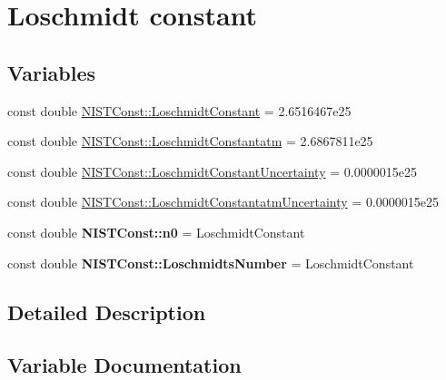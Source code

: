 \hypertarget{group___loschmidt_constant}{}\section{Loschmidt constant}
\label{group___loschmidt_constant}
\subsection*{Variables}
\begin{DoxyCompactItemize}
\item 
const double \hyperlink{group___loschmidt_constant_gab4ddc03e855109d251efa0ae9e8fb80d}{N\+I\+S\+T\+Const\+::\+Loschmidt\+Constant} = 2.\+6516467e25
\item 
const double \hyperlink{group___loschmidt_constant_ga1442f26c5c9f899f74ef7b546a41c461}{N\+I\+S\+T\+Const\+::\+Loschmidt\+Constantatm} = 2.\+6867811e25
\item 
const double \hyperlink{group___loschmidt_constant_gae1bf8845a08d0554f1045083a143c30a}{N\+I\+S\+T\+Const\+::\+Loschmidt\+Constant\+Uncertainty} = 0.\+0000015e25
\item 
const double \hyperlink{group___loschmidt_constant_gaed8885c8d2d27d9d8b88c271e0022228}{N\+I\+S\+T\+Const\+::\+Loschmidt\+Constantatm\+Uncertainty} = 0.\+0000015e25
\item 
\mbox{\label{group___loschmidt_constant_ga95b0a12ed1a4d5aa9f05a08927be123c}} 
const double {\bfseries N\+I\+S\+T\+Const\+::n0} = Loschmidt\+Constant
\item 
\mbox{\label{group___loschmidt_constant_gaf6143a6202718104ded1b92da2a0217f}} 
const double {\bfseries N\+I\+S\+T\+Const\+::\+Loschmidts\+Number} = Loschmidt\+Constant
\end{DoxyCompactItemize}


\subsection{Detailed Description}


\subsection{Variable Documentation}
\mbox{\label{group___loschmidt_constant_gab4ddc03e855109d251efa0ae9e8fb80d}} 
